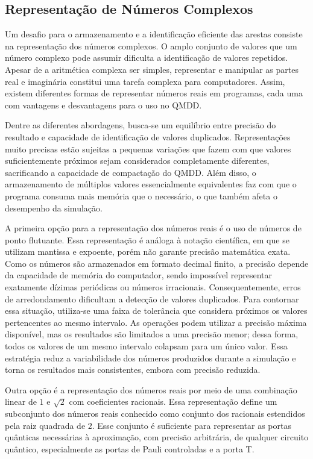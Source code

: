 \subsection{Representação de Números Complexos}

Um desafio para o armazenamento e a identificação eficiente das arestas consiste na representação dos números complexos. O amplo conjunto de valores que um número complexo pode assumir dificulta a identificação de valores repetidos. Apesar de a aritmética complexa ser simples, representar e manipular as partes real e imaginária constitui uma tarefa complexa para computadores. Assim, existem diferentes formas de representar números reais em programas, cada uma com vantagens e desvantagens para o uso no QMDD. \cite{niemann2020overcoming}

Dentre as diferentes abordagens, busca-se um equilíbrio entre precisão do resultado e capacidade de identificação de valores duplicados. Representações muito precisas estão sujeitas a pequenas variações que fazem com que valores suficientemente próximos sejam considerados completamente diferentes, sacrificando a capacidade de compactação do QMDD. Além disso, o armazenamento de múltiplos valores essencialmente equivalentes faz com que o programa consuma mais memória que o necessário, o que também afeta o desempenho da simulação.

A primeira opção para a representação dos números reais é o uso de números de ponto flutuante. Essa representação é análoga à notação científica, em que se utilizam mantissa e expoente, porém não garante precisão matemática exata. Como os números são armazenados em formato decimal finito, a precisão depende da capacidade de memória do computador, sendo impossível representar exatamente dízimas periódicas ou números irracionais. Consequentemente, erros de arredondamento dificultam a detecção de valores duplicados. Para contornar essa situação, utiliza-se uma faixa de tolerância que considera próximos os valores pertencentes ao mesmo intervalo. As operações podem utilizar a precisão máxima disponível, mas os resultados são limitados a uma precisão menor; dessa forma, todos os valores de um mesmo intervalo colapsam para um único valor. Essa estratégia reduz a variabilidade dos números produzidos durante a simulação e torna os resultados mais consistentes, embora com precisão reduzida.

Outra opção é a representação dos números reais por meio de uma combinação linear de $1$ e $\sqrt{2}$ com coeficientes racionais. Essa representação define um subconjunto dos números reais conhecido como conjunto dos racionais estendidos pela raiz quadrada de $2$. Esse conjunto é suficiente para representar as portas quânticas necessárias à aproximação, com precisão arbitrária, de qualquer circuito quântico, especialmente as portas de Pauli controladas e a porta T. \cite{bocharov2012cliffordt}

